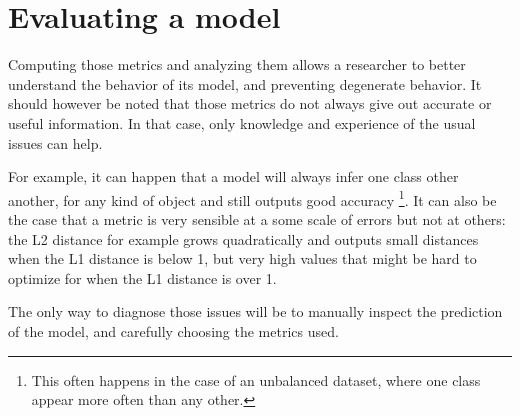 \section{Evaluating a model}
Computing those metrics and analyzing them allows a researcher to better understand the behavior of its model, and preventing degenerate behavior. It should however be noted that those metrics do not always give out accurate or useful information. In that case, only knowledge and experience of the usual issues can help.

For example, it can happen that a model will always infer one class other another, for any kind of object and still outputs good accuracy \footnote{This often happens in the case of an unbalanced dataset, where one class appear more often than any other.}. It can also be the case that a metric is very sensible at a some scale of errors but not at others: the L2 distance for example grows quadratically and outputs small distances when the L1 distance is below 1, but very high values that might be hard to optimize for when the L1 distance is over 1.

The only way to diagnose those issues will be to manually inspect the prediction of the model, and carefully choosing the metrics used. 

